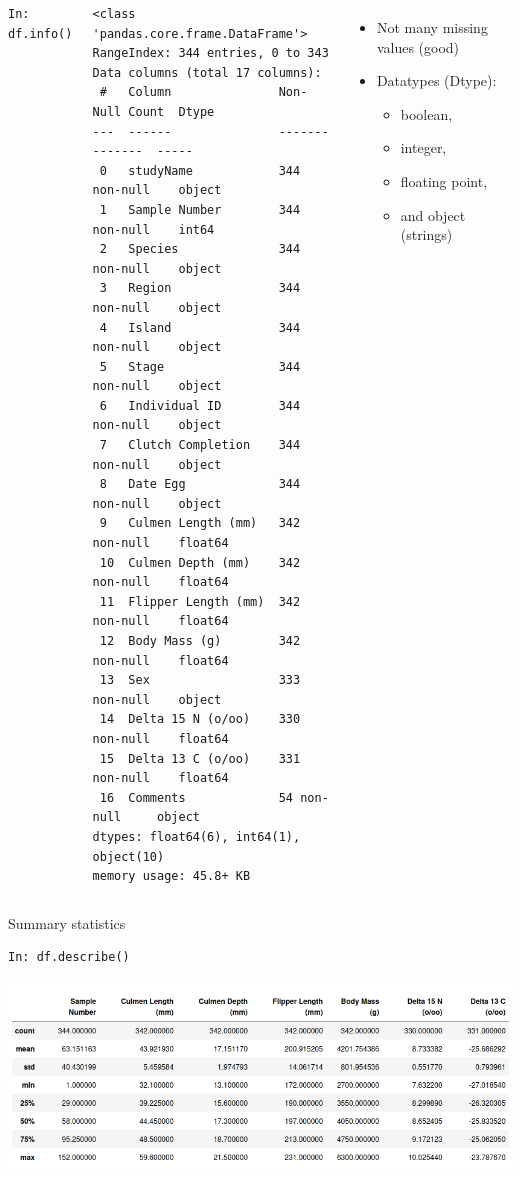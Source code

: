 \documentclass[aspectratio=169,usenames,dvipsnames]{beamer}
\begin{document}
\begin{frame}[fragile] %
\begin{columns}[t]
    \vspace{-1em}
\begin{lstlisting}[style=script]
In: df.info()
\end{lstlisting}
\vspace{-1em}
\begin{lstlisting}[style=plainscript]
<class 'pandas.core.frame.DataFrame'>
RangeIndex: 344 entries, 0 to 343
Data columns (total 17 columns):
 #   Column               Non-Null Count  Dtype  
---  ------               --------------  -----  
 0   studyName            344 non-null    object 
 1   Sample Number        344 non-null    int64  
 2   Species              344 non-null    object 
 3   Region               344 non-null    object 
 4   Island               344 non-null    object 
 5   Stage                344 non-null    object 
 6   Individual ID        344 non-null    object 
 7   Clutch Completion    344 non-null    object 
 8   Date Egg             344 non-null    object 
 9   Culmen Length (mm)   342 non-null    float64
 10  Culmen Depth (mm)    342 non-null    float64
 11  Flipper Length (mm)  342 non-null    float64
 12  Body Mass (g)        342 non-null    float64
 13  Sex                  333 non-null    object 
 14  Delta 15 N (o/oo)    330 non-null    float64
 15  Delta 13 C (o/oo)    331 non-null    float64
 16  Comments             54 non-null     object 
dtypes: float64(6), int64(1), object(10)
memory usage: 45.8+ KB
\end{lstlisting}
    \begin{itemize}
        \item Not many missing values (good)
        \item Datatypes (Dtype):
        \begin{itemize}\item boolean, \item integer, \item floating point, \item and object (strings)\end{itemize}
    \end{itemize}
\end{columns}
\end{frame}

\begin{frame}[fragile]{Summary statistics}
\begin{lstlisting}
In: df.describe()
\end{lstlisting}

\includegraphics[height=0.7\textheight]{fig/penguinsdescribe}
\end{frame}
\end{document}

